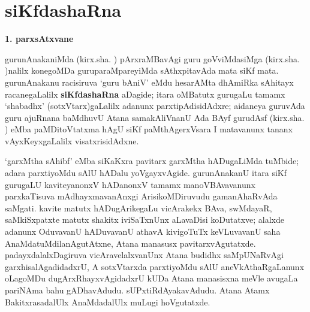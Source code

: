 \makeatletter
\def\@makechapterhead#1{%
  \vspace*{10\p@}%
{\fontsize{13pt}{13pt}\selectfont\raggedright{\bf  BeY joVdf siMgf}\par}
\vspace*{25\p@}%
  {\parindent \z@ \centering \normalfont
    \ifnum \c@secnumdepth >\m@ne
      \if@mainmatter
        {\huge\bfseries  #1}\par\nobreak
	\vskip 4pt
      \fi
    \fi
\smallskip 

 \vskip 10\p@  
{\fontsize{12pt}{12pt}\selectfont\raggedleft{anu: \bf pu.ti.na.}\par}
  }
\vskip 40\p@}
\makeatother


\chapter{siKfdashaRna}\label{chap007}

\begin{center}
{\Large\bf 1. parxsAtxvane}
\end{center}

gurunAnakaniMda (kirx.sha. ) pArxraMBavAgi guru goVviMdasiMga (kirx.sha. )nalilx konegoMDa guruparaMpareyiMda sAthxpitavAda mata siKf mata. gurunAnakanu racisiruva `guru bAniV' eMdu hesarAMta dhAmiRka sAhitayx racanegaLalilx {\bf siKfdashaRna} aDagide; itara oMBatutx gurugaLu tamamx `shabadhx' (sotxVtarx)gaLalilx adanunx parxtipAdisidAdxre; aidaneya guruvAda guru ajuRnana baMdhuvU Atana samakAliVnanU Ada BAyf gurudAsf (kirx.sha. ) eMba paMDitoVtatxma hAgU siKf paMthAgerxVsara I matavanunx tananx vAyxKeyxgaLalilx visatxrisidAdxne.

`garxMtha sAhibf' eMba siKaKxra pavitarx garxMtha hADugaLiMda tuMbide; adara parxti\-yoMdu sAlU hADalu yoVgayxvAgide. gurunAnakanU itara siKf gurugaLU kaviteyanonxV hADanonxV tamamx manoVBAvavanunx parxkaTisuva mAdhayxma\-vanAnxgi Arisi\-koMDiruvudu gamanAhaRvAda saMgati. kavite matutx hADugArikegaLu vicArakekx BAva, swMdayaR, saMkiSxpatxte matutx shakitx iviSaTxnUnx aLavaDisi koDutatxve; alalxde adanunx OduvavanU hADuvavanU athavA kivigoTuTx keVLuvavanU saha AnaMdatuMdila\-nAgutAtxne, Atana manasusx pavitarxvAgutatxde. padayxdalalxDagiruva vicAravelalxvanUnx Atana budidhx saMpUNaRvAgi garxhisalAgadidadxrU, A sotxVtarxda parxtiyoMdu sAlU aneVkAthaRgaLanunx oLagoMDu dugArxRhayxvAgidadxrU kUDa Atana manasisxna meVle avugaLa pari\-NAma bahu gADhavAdudu. sUPxtiRdAyakavAdudu. Atana Atamx BakitxrasadalUlx AnaMda\-dalUlx muLugi hoVgutatxde.


